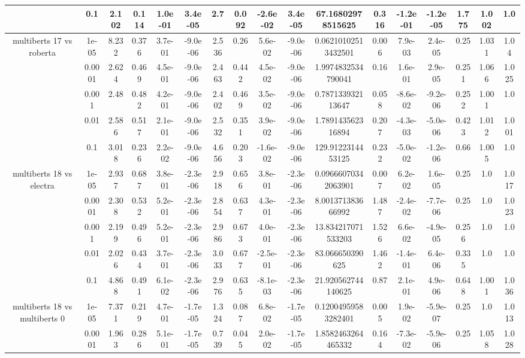 \begin{tabular}{|c|c|c|c|c|c|c|c|c|c|c|c|c|c|c|c|c|}
 & 0.1 & 2.102 & 0.114 & 1.0e-01 & 3.4e-05 & 2.7 & 0.092 & -2.6e-02 & 3.4e-05 & 67.16802978515625 & 0.316 & -1.2e-01 & -1.2e-05 & 1.775 & 1.002 & 1.0 \\
\hline
\multirow{5}{*}{multiberts 17 vs roberta } & 1e-05 & 8.232 & 0.376 & 3.7e-01 & -9.0e-06 & 2.536 & 0.26 & 5.6e-02 & -9.0e-06 & 0.06210102513432501 & 0.006 & 7.9e-03 & 2.4e-05 & 0.25 & 1.031 & 1.04 \\
 & 0.0001 & 2.624 & 0.469 & 4.5e-01 & -9.0e-06 & 2.463 & 0.442 & 4.5e-02 & -9.0e-06 & 1.9974832534790041 & 0.16 & 1.6e-01 & 2.9e-05 & 0.251 & 1.066 & 1.025 \\
 & 0.001 & 2.48 & 0.482 & 4.2e-01 & -9.0e-06 & 2.402 & 0.469 & 3.5e-02 & -9.0e-06 & 0.787133932113647 & 0.058 & -8.6e-02 & -9.2e-06 & 0.252 & 1.001 & 1.0 \\
 & 0.01 & 2.586 & 0.517 & 2.1e-01 & -9.0e-06 & 2.532 & 0.351 & 3.9e-02 & -9.0e-06 & 1.789143562316894 & 0.207 & -4.3e-03 & -5.0e-06 & 0.423 & 1.012 & 1.001 \\
 & 0.1 & 3.018 & 0.236 & 2.2e-02 & -9.0e-06 & 4.656 & 0.203 & -1.6e-02 & -9.0e-06 & 129.9122314453125 & 0.232 & -5.0e-02 & -1.2e-06 & 0.66 & 1.005 & 1.0 \\
\hline
\multirow{5}{*}{multiberts 18 vs electra } & 1e-05 & 2.937 & 0.687 & 3.8e-01 & -2.3e-06 & 2.918 & 0.656 & 3.8e-01 & -2.3e-06 & 0.09666070342063901 & 0.007 & 6.2e-02 & 1.6e-05 & 0.25 & 1.0 & 1.017 \\
 & 0.0001 & 2.308 & 0.532 & 5.2e-01 & -2.3e-06 & 2.854 & 0.637 & 4.3e-01 & -2.3e-06 & 8.001371383666992 & 1.487 & -2.4e-02 & -7.7e-06 & 0.25 & 1.0 & 1.023 \\
 & 0.001 & 2.199 & 0.496 & 5.2e-01 & -2.3e-06 & 2.986 & 0.673 & 4.0e-01 & -2.3e-06 & 13.834217071533203 & 1.526 & 6.6e-02 & -4.9e-05 & 0.256 & 1.0 & 1.0 \\
 & 0.01 & 2.026 & 0.434 & 3.7e-01 & -2.3e-06 & 3.033 & 0.677 & -2.5e-01 & -2.3e-06 & 83.066650390625 & 1.462 & -1.4e-01 & 6.4e-06 & 0.335 & 1.0 & 1.0 \\
 & 0.1 & 4.868 & 0.491 & 6.1e-02 & -2.3e-06 & 2.976 & 0.635 & -8.1e-03 & -2.3e-06 & 21.920562744140625 & 0.87 & 2.1e-01 & 4.9e-06 & 0.648 & 1.001 & 1.036 \\
\hline
\multirow{5}{*}{multiberts 18 vs multiberts 0} & 1e-05 & 7.371 & 0.219 & 4.7e-01 & -1.7e-05 & 1.324 & 0.087 & 6.8e-02 & -1.7e-05 & 0.12004959583282401 & 0.005 & 1.9e-02 & -5.9e-07 & 0.25 & 1.0 & 1.013 \\
 & 0.0001 & 1.963 & 0.286 & 5.1e-01 & -1.7e-05 & 0.739 & 0.045 & 2.0e-02 & -1.7e-05 & 1.8582463264465332 & 0.164 & -7.3e-02 & -5.9e-06 & 0.25 & 1.058 & 1.028 \\

\end{tabular}
